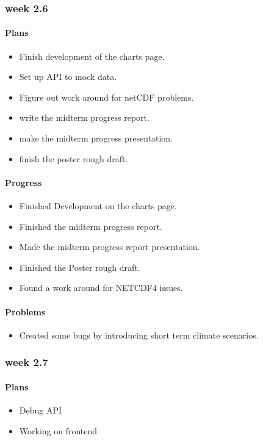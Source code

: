 \documentclass[onecolumn, draftclsnofoot,10pt, compsoc]{article}
\begin{document}
				\subsubsection{week 2.6}
					\paragraph{Plans}
						\begin{itemize}
							\item Finish development of the charts page.
							\item Set up API to mock data.
							\item Figure out work around for netCDF problems.
							\item write the midterm progress report.
							\item make the midterm progress presentation.
							\item finish the poster rough draft.
						\end{itemize}
						\paragraph{Progress}
						\begin{itemize}
							\item Finished Development on the charts page.
							\item Finished the midterm progress report.
							\item Made the midterm progress report presentation.
							\item Finished the Poster rough draft.
							\item Found a work around for NETCDF4 issues.
						\end{itemize}
						\paragraph{Problems}
						\begin{itemize}
							\item Created some bugs by introducing short term climate scenarios.
						\end{itemize}

				\subsubsection{week 2.7}
					\paragraph{Plans}
						\begin{itemize}
							\item Debug API
							\item Working on frontend
						\end{itemize}
\end{document}
